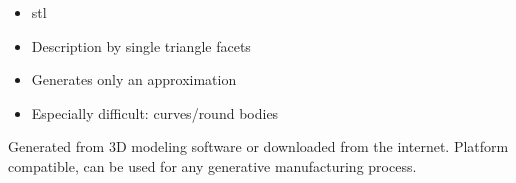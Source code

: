 \begin{frame}
    \begin{itemize}
        \item \acl{stl}
        \item Description by single triangle facets
        \item Generates only an approximation
        \item Especially difficult: curves/round bodies
    \end{itemize}
    \begin{exampleblock}{}
        Generated from 3D modeling software or downloaded from the internet.
        Platform compatible, can be used for any generative manufacturing process.
    \end{exampleblock}
\end{frame}